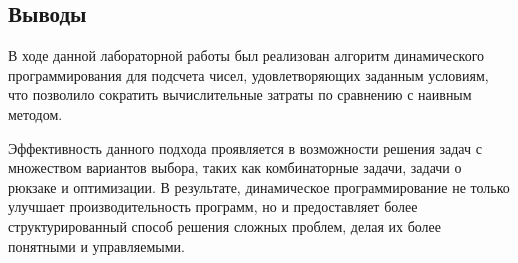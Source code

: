 \documentclass[12pt]{article}
\begin{document}
\begin{figure}[htbp]
    \centering
    \label{fig:graph}
\end{figure}

\newpage
\subsection*{Выводы}

В ходе данной лабораторной работы был реализован алгоритм динамического программирования для подсчета чисел, удовлетворяющих заданным условиям, что позволило сократить вычислительные затраты по сравнению с наивным методом.

Эффективность данного подхода проявляется в возможности решения задач с множеством вариантов выбора, таких как комбинаторные задачи, задачи о рюкзаке и оптимизации. В результате, динамическое программирование не только улучшает производительность программ, но и предоставляет более структурированный способ решения сложных проблем, делая их более понятными и управляемыми.
\end{document}
